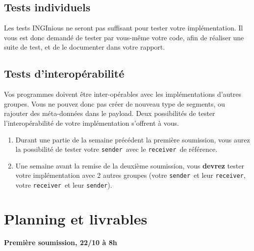 \documentclass[a4paper,12pt]{article}
\newcommand{\sender}{\texttt{sender}}
\newcommand{\receiver}{\texttt{receiver}}
\begin{document}
\subsection{Tests individuels}
Les tests INGInious ne seront pas suffisant pour tester votre implémentation. Il vous est donc
demandé de tester par vous-même votre code, afin de réaliser une suite de test, et de le documenter
dans votre rapport.

\subsection{Tests d'interopérabilité}
Vos programmes doivent être inter-opérables avec les implémentations d'autres groupes.
Vous ne pouvez donc pas créer de nouveau type de segments, ou rajouter des méta-données
dans le payload. 
Deux possibilités de tester l'interopérabilité de votre implémentation s'offrent à vous.
\begin{enumerate}
	\item Durant une partie de la semaine précédent la première soumission, vous aurez la possibilité de tester votre \sender\ avec le \receiver\ de référence.
	\item Une semaine avant la remise de la deuxième soumission, vous \textbf{devrez} tester votre implémentation
	avec 2 autres groupes (votre \sender\ et leur \receiver, votre \receiver\ et leur \sender).
\end{enumerate}

\section{Planning et livrables}

\medskip
\textbf{Première soumission, 22/10 à 8h} %
\end{document}
